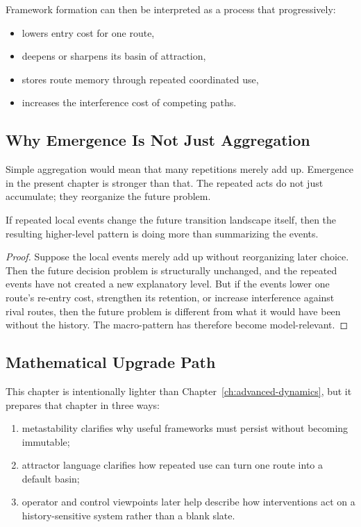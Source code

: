 Framework formation can then be interpreted as a process that progressively:
\begin{itemize}[nosep]
  \item lowers entry cost for one route,
  \item deepens or sharpens its basin of attraction,
  \item stores route memory through repeated coordinated use,
  \item increases the interference cost of competing paths.
\end{itemize}

\subsection{Why Emergence Is Not Just Aggregation}

Simple aggregation would mean that many repetitions merely add up. Emergence in
the present chapter is stronger than that. The repeated acts do not just
accumulate; they reorganize the future problem.

\begin{lemma}
If repeated local events change the future transition landscape itself, then
the resulting higher-level pattern is doing more than summarizing the events.
\end{lemma}

\begin{proof}
Suppose the local events merely add up without reorganizing later choice. Then
the future decision problem is structurally unchanged, and the repeated events
have not created a new explanatory level. But if the events lower one route's
re-entry cost, strengthen its retention, or increase interference against
rival routes, then the future problem is different from what it would have been
without the history. The macro-pattern has therefore become model-relevant.
\end{proof}

\subsection{Mathematical Upgrade Path}

This chapter is intentionally lighter than Chapter~\ref{ch:advanced-dynamics},
but it prepares that chapter in three ways:
\begin{enumerate}[nosep]
  \item metastability clarifies why useful frameworks must persist without
        becoming immutable;
  \item attractor language clarifies how repeated use can turn one route into a
        default basin;
  \item operator and control viewpoints later help describe how interventions
        act on a history-sensitive system rather than a blank slate.
\end{enumerate}

